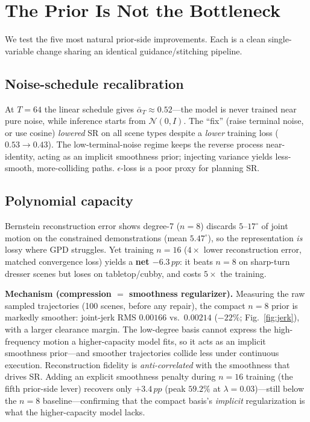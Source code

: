 \documentclass[10pt,twocolumn]{article}
\newcommand{\pp}{\,pp}
\begin{document}
\section{The Prior Is Not the Bottleneck}
We test the five most natural prior-side improvements. Each is a clean
single-variable change sharing an identical guidance/stitching pipeline.

\subsection{Noise-schedule recalibration}
At $T{=}64$ the linear schedule gives $\bar\alpha_T\!\approx\!0.52$---the model is
never trained near pure noise, while inference starts from $\mathcal N(0,I)$. The
``fix'' (raise terminal noise, or use cosine) \emph{lowered} SR on all scene types
despite a \emph{lower} training loss ($0.53\!\to\!0.43$). The low-terminal-noise
regime keeps the reverse process near-identity, acting as an implicit smoothness
prior; injecting variance yields less-smooth, more-colliding paths.
$\epsilon$-loss is a poor proxy for planning SR.

\subsection{Polynomial capacity}
\label{sec:capacity}
Bernstein reconstruction error shows degree-7 ($n{=}8$) discards $5$--$17^\circ$ of
joint motion on the constrained demonstrations (mean $5.47^\circ$), so the
representation \emph{is} lossy where GPD struggles. Yet training $n{=}16$
($4\times$ lower reconstruction error, matched convergence loss) yields a
\textbf{net $-6.3\pp$}: it beats $n{=}8$ on sharp-turn dresser scenes but loses on
tabletop/cubby, and costs $5\times$ the training.

\noindent\textbf{Mechanism (compression $=$ smoothness regularizer).} Measuring the
raw sampled trajectories (100 scenes, before any repair), the compact $n{=}8$
prior is markedly smoother: joint-jerk RMS $0.00166$ vs.\ $0.00214$ ($-22\%$;
Fig.~\ref{fig:jerk}), with a larger clearance margin. The low-degree basis cannot
express the high-frequency motion a higher-capacity model fits, so it acts as an
implicit smoothness prior---and smoother trajectories collide less under
continuous execution. Reconstruction fidelity is \emph{anti-correlated} with the
smoothness that drives SR. Adding an explicit smoothness penalty during $n{=}16$
training (the fifth prior-side lever) recovers only $+3.4\pp$ (peak $59.2\%$ at
$\lambda{=}0.03$)---still below the $n{=}8$ baseline---confirming that the compact
basis's \emph{implicit} regularization is what the higher-capacity model lacks.
\end{document}
